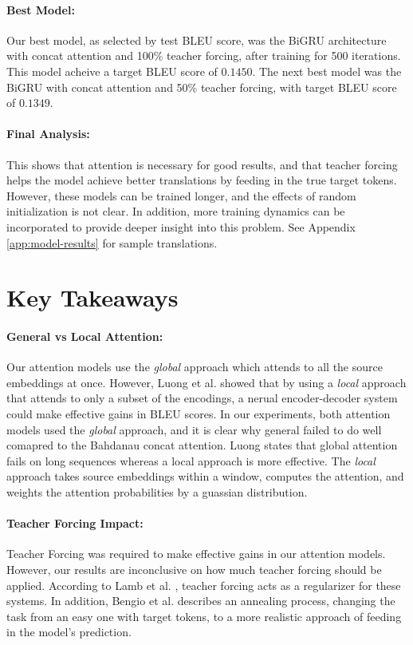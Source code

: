\documentclass[twoside,twocolumn]{article}
\begin{document}
\paragraph{Best Model:}
Our best model, as selected by test BLEU score, was the BiGRU architecture
with concat attention and 100\% teacher forcing, after training for 500
iterations. This model acheive a target BLEU score of $0.1450$. The next best
model was the BiGRU with concat attention and 50\% teacher forcing, with target
BLEU score of $0.1349$.
\paragraph{Final Analysis:}
This shows that attention is necessary for good results, and that teacher
forcing helps the model achieve better translations by feeding in the true
target tokens. However, these models can be trained longer, and the effects
of random initialization is not clear. In addition, more training dynamics can
be incorporated to provide deeper insight into this problem. See Appendix
\ref{app:model-results} for sample translations.
\section{Key Takeaways}
\label{sec:key-takeaway}
\paragraph{General vs Local Attention:}
\label{sec:key-attention}
Our attention models use the \emph{global} approach which attends to all the
source embeddings at once. However, Luong et al. \cite{luong2015effective}
showed that by using a \emph{local} approach that attends to only a subset
of the encodings, a nerual encoder-decoder system could make effective gains in
BLEU scores. In our experiments, both attention models used the \emph{global} approach, and
it is clear why general failed to do well comapred to the Bahdanau concat
attention. Luong states that global attention fails on long sequences whereas
a local approach is more effective. The \emph{local} approach takes
source embeddings within a window, computes the attention, and weights the
attention probabilities by a guassian distribution.
\paragraph{Teacher Forcing Impact:}
Teacher Forcing was required to make effective gains in our attention models.
However, our results are inconclusive on how much teacher forcing should be
applied. According to Lamb et al. \cite{lamb2016professor}, teacher forcing
acts as a regularizer for these systems. In addition, Bengio et al.
\cite{DBLP:journals/corr/BengioVJS15} describes an annealing
process, changing the task from an easy one with target tokens, to a more
realistic approach of feeding in the model's prediction.
\end{document}
